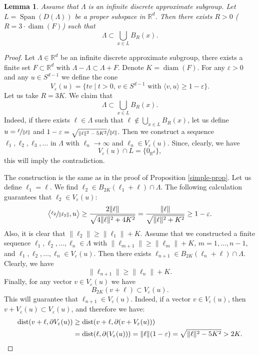 \documentclass[JEP,XML,SOM,Unicode,NoEqCountersInSection]{cedram}
\DeclareMathOperator{\diam}{diam}
\DeclareMathOperator{\dist}{dist}
\DeclareMathOperator{\Span}{Span}
\newcommand{\bR}{\mathbb{R}}
\let\eps\varepsilon
\newcounter{dummy} \numberwithin{dummy}{section}
\theoremstyle{plain}
\newtheorem{lemma}[dummy]{Lemma}
\theoremstyle{definition}
\begin{document}
\begin{lemma}\label{lemma}
Assume that $\Lambda$ is an infinite discrete approximate subgroup. Let $L = \Span(D(\Lambda))$ be a proper subspace in $\bR^d$. Then there exists $R > 0$ ($R = 3\cdot \diam(F)$) such that
\[
\Lambda \subset \bigcup_{x \in L} B_R(x).
\]
\end{lemma}
\begin{proof}
Let $\Lambda \in \bR^d$ be an infinite discrete approximate subgroup, \ie there exists a finite set $F \subset \bR^d$ with $\Lambda - \Lambda \subset \Lambda + F$. Denote $K = \diam(F)$.
For any $\eps > 0$ and any $u \in S^{d-1}$ we define the cone
\[
V_{\eps}(u) = \{ t v \mid t > 0,\, v \in S^{d-1} \text{ with } \langle v, u \rangle \ge 1 - \eps \}.
\]
Let us take $R = 3K$. We claim that
\[
\Lambda \subset \bigcup_{x \in L} B_R(x).
\]
Indeed, if there exists $\ell \in \Lambda$ such that $\ell \not \in \bigcup_{x \in L} B_R(x)$, let us define $u = \sfrac{\ell}{\| \ell \|}$ and $1 - \eps = \sfrac{\sqrt{\| \ell \|^2 - 5K^2}}{\| \ell \|}$. Then we construct a sequence $\ell_1, \ell_2,\ell_3,\ldots$ in $\Lambda$ with $\ell_n \to \infty$ and $\ell_n \in V_{\eps}(u)$. Since, clearly, we have
\[
V_{\eps}(u) \cap L = \{ 0_{\bR^d} \},
\]
this will imply the contradiction.

The construction is the same as in the proof of Proposition \ref{simple-prop}. Let us define $\ell_1 = \ell$. We find $\ell_2 \in B_{2K}(\ell_1 + \ell) \cap \Lambda$. The following calculation guarantees that $\ell_2 \in V_{\eps}(u)$:
\[
\bigl\langle \sfrac{\ell_2}{\| \ell_2 \|}, u \bigr\rangle \ge \frac{2 \| \ell \|}{\sqrt{4\| \ell \|^2+ 4 K^2}} = \frac{\| \ell \|}{ \sqrt{\|\ell \|^2 + K^2}} \ge 1 - \eps.
\]
Also, it is clear that $\|\ell_2 \| \ge \| \ell_1 \| +K$. Assume that we constructed a finite sequence $\ell_1,\ell_2, \ldots, \ell_n \in \Lambda$ with $\| \ell_{m+1} \| \ge \| \ell_m \| + K$, $m=1,\ldots,n-1$, and $\ell_1,\ell_2,\ldots,\ell_n \in V_{\eps}(u)$. Then there exists $\ell_{n+1} \in B_{2K}(\ell_n + \ell) \cap \Lambda$. Clearly, we have
\[
\| \ell_{n+1} \| \ge \| \ell_n \| + K.
\]
Finally, for any vector $v \in V_{\eps}(u)$ we have
\[
B_{2K}(v + \ell) \subset V_{\eps}(u).
\]
This will guarantee that $\ell_{n+1} \in V_{\eps}(u)$. Indeed, if a vector $v \in V_{\eps}(u)$, then $v+ V_{\eps}(u) \subset V_{\eps}(u)$, and therefore we have:
\begin{align*}
\dist(v+\ell, \partial V_{\eps}(u)) &\ge \dist(v + \ell, \partial(v + V_{\eps}(u)))\\
& = \dist(\ell, \partial(V_{\eps}(u))) = \| \ell \| (1-\eps)
= \sqrt{\| \ell \|^2 - 5K^2} > 2K. \qedhere
\end{align*}
\end{proof}
\end{document}
